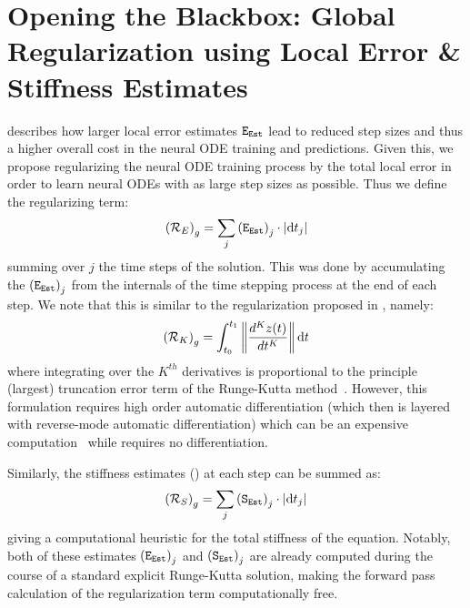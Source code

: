 \section{Opening the Blackbox: Global Regularization using Local Error \& Stiffness Estimates}
\label{sec:global_regularization_using_local_error_and_stiffness_estimates}

 describes how larger local error estimates $\texttt{E}_{\texttt{Est}}$ lead to reduced step sizes and thus a higher overall cost in the neural ODE training and predictions. Given this, we propose regularizing the neural ODE training process by the total local error in order to learn neural ODEs with as large step sizes as possible. Thus we define the regularizing term:
%
\begin{equation}
  \label{eq:reg_eest_global}
  \left(\mathcal{R}_{E}\right)_g = \sum_j \left(\texttt{E}_{\texttt{Est}}\right)_j \cdot |\mathrm{d}t_j|
\end{equation}
%
summing over $j$ the time steps of the solution. This was done by accumulating the $\left(\texttt{E}_{\texttt{Est}}\right)_j$ from the internals of the time stepping process at the end of each step. We note that this is similar to the regularization proposed in \citet{kelly2020learning}, namely:
%
\begin{equation}
  \label{eq:reg_global_kelly}
  \left(\mathcal{R}_{K}\right)_g = \int_{t_0}^{t_1} \left\|\frac{d^K z(t)}{dt^K}\right\| \mathrm{d}t
\end{equation}
%
where integrating over the $K^{th}$ derivatives is proportional to the principle (largest) truncation error term of the Runge-Kutta method~\citep{hairer1}. However, this formulation requires high order automatic differentiation (which then is layered with reverse-mode automatic differentiation) which can be an expensive computation~\cite{zhang2008computing} while  requires no differentiation.

Similarly, the stiffness estimates () at each step can be summed as:
%
\begin{equation}
  \label{eq:reg_stiffness_global}
  \left(\mathcal{R}_{S}\right)_g = \sum_j \left(\texttt{S}_{\texttt{Est}}\right)_j \cdot |\mathrm{d}t_j|
\end{equation}
%
giving a computational heuristic for the total stiffness of the equation. Notably, both of these estimates $\left(\texttt{E}_{\texttt{Est}}\right)_j$ and $\left(\texttt{S}_{\texttt{Est}}\right)_j$ are already computed during the course of a standard explicit Runge-Kutta solution, making the forward pass calculation of the regularization term computationally free.


